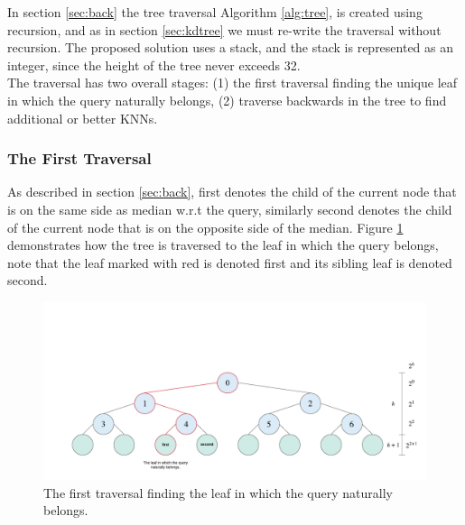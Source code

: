 In section \ref{sec:back} the tree traversal Algorithm \ref{alg:tree}, is created using recursion, and as in section \ref{sec:kdtree} we must re-write the traversal without recursion. The proposed solution uses a stack, and the stack is represented as an integer, since the height of the tree never exceeds 32. 
\\[2mm]
The traversal has two overall stages: (1) the first traversal finding the unique leaf in which the query naturally belongs, (2) traverse backwards in the tree to find additional or better KNNs. 

\subsubsection{The First Traversal}

As described in section \ref{sec:back}, first denotes the child of the current node that is on the same side as median w.r.t the query, similarly second denotes the child of the current node that is on the opposite side of the median. 
Figure \ref{fig:t1} demonstrates how the tree is traversed to the leaf in which the query belongs, note that the leaf marked with red is denoted first and its sibling leaf is denoted second. 

\begin{figure}[H]
\centering
\includegraphics[width=1\textwidth]{pics/kd-tree-visual/22.png}
\caption{The first traversal finding the leaf in which the query naturally belongs.}
\label{fig:t1}
\end{figure}



